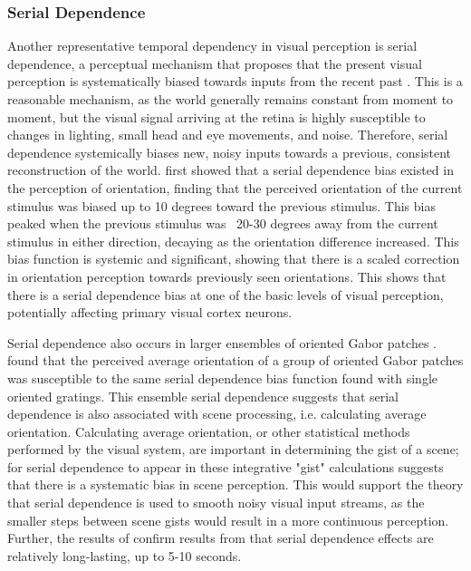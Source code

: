 \documentclass[../main.tex]{subfiles}
\begin{document}
\subsubsection*{Serial Dependence}
Another representative temporal dependency in visual perception is serial dependence, a perceptual mechanism that proposes that the present visual perception is systematically biased towards inputs from the recent past \citep{fischer_whitney_2014, Cicchini7867}. This is a reasonable mechanism, as the world generally remains constant from moment to moment, but the visual signal arriving at the retina is highly susceptible to changes in lighting, small head and eye movements, and noise. Therefore, serial dependence systemically biases new, noisy inputs towards a previous, consistent reconstruction of the world. \cite{fischer_whitney_2014} first showed that a serial dependence bias existed in the perception of orientation, finding that the perceived orientation of the current stimulus was biased up to 10 degrees toward the previous stimulus. This bias peaked when the previous stimulus was ~20-30 degrees away from the current stimulus in either direction, decaying as the orientation difference increased. This bias function is systemic and significant, showing that there is a scaled correction in orientation perception towards previously seen orientations. This shows that there is a serial dependence bias at one of the basic levels of visual perception, potentially affecting primary visual cortex neurons.

Serial dependence also occurs in larger ensembles of oriented Gabor patches \citep{Manassi}. \cite{Manassi} found that the perceived average orientation of a group of oriented Gabor patches was susceptible to the same serial dependence bias function found with single oriented gratings. This ensemble serial dependence suggests that serial dependence is also associated with scene processing, i.e. calculating average orientation. Calculating average orientation, or other statistical methods performed by the visual system, are important in determining the gist of a scene; for serial dependence to appear in these integrative "gist" calculations suggests that there is a systematic bias in scene perception. This would support the theory that serial dependence is used to smooth noisy visual input streams, as the smaller steps between scene gists would result in a more continuous perception. Further, the results of \cite{Manassi} confirm results from \cite{fischer_whitney_2014} that serial dependence effects are relatively long-lasting, up to 5-10 seconds.
\end{document}
